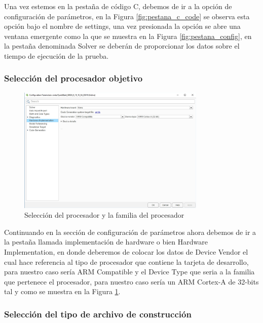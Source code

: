 Una vez estemos en la pestaña de código C, debemos de ir a la opción de configuración de parámetros, en la Figura \ref{fig:pestana_c_code} se observa esta opción bajo el nombre de settings, una vez presionada la opción se abre una ventana emergente como la que se muestra en la Figura \ref{fig:pestana_config}, en la pestaña denominada Solver se deberán de proporcionar los datos sobre el tiempo de ejecución de la prueba.

\subsubsection{Selección del procesador objetivo}

\begin{figure}[h!]
    \centering
    \includegraphics[width=0.8\textwidth]{fig/especifico_2/paso_a_paso_mtmt/configuration_parameters_processor.png}
    \caption{Selección del procesador y la familia del procesador}
    \label{fig:pestana_config_procesador}
\end{figure}

Continuando en la sección de configuración de parámetros ahora debemos de ir a la pestaña llamada implementación de hardware o bien Hardware Implementation, en donde deberemos de colocar los datos de Device Vendor el cual hace referencia al tipo de procesador que contiene la tarjeta de desarrollo, para nuestro caso sería ARM Compatible y el Device Type que seria a la familia que pertenece el procesador, para nuestro caso sería un ARM Cortex-A de 32-bits tal y como se muestra en la Figura \ref{fig:pestana_config_procesador}.


\subsubsection{Selección del tipo de archivo de construcción}

